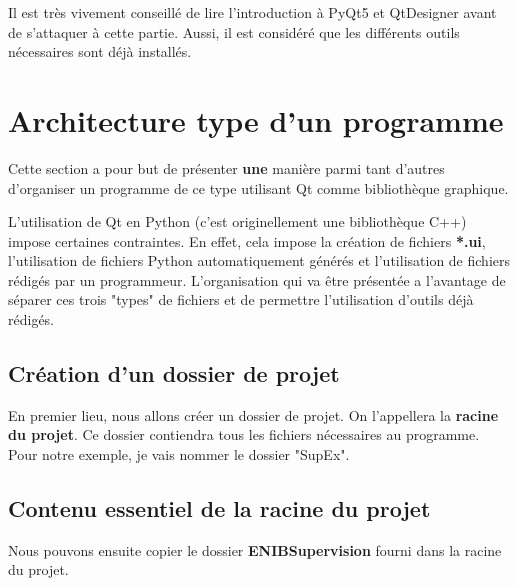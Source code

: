 \documentclass[12pt]{report}    %
\begin{document}
Il est très vivement conseillé de lire l'introduction à PyQt5 et QtDesigner avant de s'attaquer à cette partie. Aussi, il est considéré que les différents outils nécessaires sont déjà installés.



\section{Architecture type d'un programme}

Cette section a pour but de présenter \textbf{une} manière parmi tant d'autres d'organiser un programme de ce type utilisant Qt comme bibliothèque graphique.

L'utilisation de Qt en Python (c'est originellement une bibliothèque C++) impose certaines contraintes. En effet, cela impose la création de fichiers \textbf{*.ui}, l'utilisation de fichiers Python automatiquement générés et l'utilisation de fichiers rédigés par un programmeur.\newline
L'organisation qui va être présentée a l'avantage de séparer ces trois "types" de fichiers et de permettre l'utilisation d'outils déjà rédigés.

\subsection{Création d'un dossier de projet}

En premier lieu, nous allons créer un dossier de projet. On l'appellera la \textbf{racine du projet}. Ce dossier contiendra tous les fichiers nécessaires au programme.\newline
Pour notre exemple, je vais nommer le dossier "SupEx".\newline

\subsection{Contenu essentiel de la racine du projet}

Nous pouvons ensuite copier le dossier \textbf{ENIBSupervision} fourni dans la racine du projet.\newline
\end{document}
